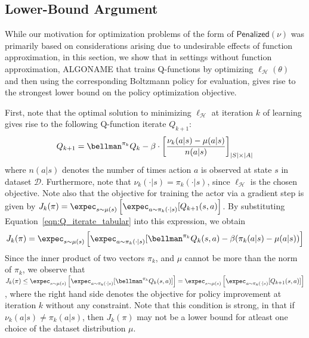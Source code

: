 \subsection{Lower-Bound Argument}
While our motivation for optimization problems of the form of $\mathsf{Penalized}(\nu)$ was primarily based on considerations arising due to undesirable effects of function approximation,
in this section, we show that in settings without function approximation, ALGONAME that trains
Q-functions by optimizing $\ell_\mathcal{H}(\theta)$ and then using the corresponding Boltzmann policy for evaluation, gives rise to the strongest lower bound on the policy optimization objective.

First, note that the optimal solution to minimizing $\ell_\mathcal{H}$ at iteration $k$ of learning gives rise to the following Q-function iterate $Q_{k+1}$:
\begin{equation}
    \label{eqn:Q_iterate_tabular}
    Q_{k+1} = \bellman^{\pi_k} Q_{k} - \beta \cdot \left[\frac{\nu_k(a|s) - \mu(a|s)}{n(a|s)} \right]_{|S| \times |A|}
\end{equation}
where $n(a|s)$ denotes the number of times action $a$ is observed at state $s$ in dataset $\mathcal{D}$. Furthermore, note that $\nu_k(\cdot|s) = \pi_k(\cdot|s)$, since $\ell_{\mathcal{H}}$ is the chosen objective. Note also that the objective for training the actor via a gradient step
is given by $J_k(\pi) = \expec_{s \sim \mu(s)} \left[ \expec_{a \sim \pi_k(\cdot|s)}[Q_{k+1}(s, a) \right]$. By substituting Equation~\ref{eqn:Q_iterate_tabular} into this expression, we obtain
\begin{equation}
    J_k(\pi) = \expec_{s \sim \mu(s)} \left[ \expec_{a \sim \pi_k(\cdot|s)}[\bellman^{\pi_k} Q_k(s, a) - \beta (\pi_k(a|s) - \mu(a|s)) \right]
\end{equation}
Since the inner product of two vectors $\pi_k$, and $\mu$ cannot be more than the norm of $\pi_k$, we observe that $J_k(\pi) \leq \expec_{s \sim \mu(s)} \left[ \expec_{a \sim \pi_k(\cdot|s)}[\bellman^{\pi_k} Q_k(s, a)] \right] = \expec_{s \sim \mu(s)} \left[ \expec_{a \sim \pi_k(\cdot|s)}[Q_{k+1}(s, a)] \right]$, where the right hand side denotes the objective for policy improvement at iteration $k$ without any constraint. Note that this condition is strong, in that if $\nu_k(a|s) \neq \pi_k(a|s)$, then $J_k(\pi)$ may not be a lower bound for atleast one choice of the dataset distribution $\mu$.


